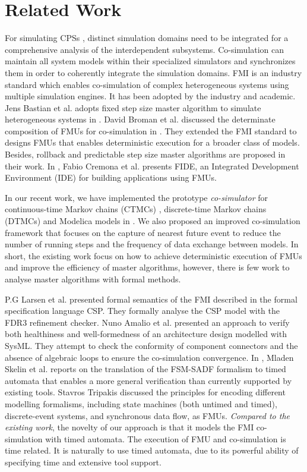 \section{Related Work}
\label{sec:relateworks}
For simulating CPSs \cite{GeorgMRW14}, distinct
simulation domains need to be integrated for a comprehensive
analysis of the interdependent subsystems. Co-simulation \cite{Bogomolov2015Co} can maintain all system models within their specialized simulators
and synchronizes them in order to coherently integrate the simulation domains. FMI \cite{Blochwitz2011The}\cite{FMI2INTRO} is an industry standard which enables co-simulation of complex heterogeneous systems using multiple simulation engines. It has been adopted by the industry and academic. Jens Bastian et al. adopts fixed step size master algorithm to simulate heterogeneous
systems in \cite{Bastian2011Master}.
David Broman et al. discussed the determinate composition of FMUs for co-simulation in \cite{BromanBGLMTW13}. They extended the FMI standard to designs FMUs that enables deterministic execution for a broader class of models. Besides, rollback and predictable step size master algorithms are proposed in their work. In \cite{CremonaLTBL16}, Fabio Cremona et al. presents FIDE, an Integrated Development Environment
(IDE) for building applications using FMUs. 

In our recent work, we have implemented the prototype \textit{co-simulator} for continuous-time Markov chains (CTMCs) \cite{DanosHGS17}, discrete-time Markov chains (DTMCs) \cite{Guerry13} and Modelica models in \cite{LiuJWCD16}. We also proposed an improved co-simulation framework that focuses on the capture of nearest future event to reduce the number of running steps and the frequency of data exchange between models. In short, the existing work focus on how to achieve deterministic execution of FMUs and improve the efficiency of master algorithms, however, there is few work to analyse master algorithms with formal methods.

P.G Larsen et al. \cite{Larsen2016Integrated} presented formal semantics of the FMI described in the formal specification language CSP. They 
formally analyse the CSP model with the FDR3 refinement checker. Nuno Amalio et al. \cite{AmalioPCW16} presented an approach to verify both healthiness and well-formedness of an architecture design modelled with SysML. They attempt to check the conformity of component connectors and the absence of algebraic loops to ensure the co-simulation convergence.
In \cite{SkelinWOHL15}, Mladen Skelin et al. reports on the translation of the FSM-SADF formalism to timed automata that enables a more general
verification than currently supported by existing tools. Stavros Tripakis \cite{Tripakis15} discussed the principles for encoding different modelling formalisms, including state machines (both untimed and timed), discrete-event systems, and synchronous data flow, as FMUs. 
\emph{Compared to the existing work}, the novelty of our approach is that it models the FMI co-simulation with timed automata. The execution of FMU and co-simulation is time related. It is naturally to use timed automata, due to its powerful ability of specifying time and extensive tool support.


